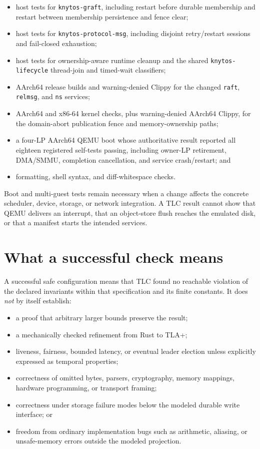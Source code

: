 \begin{itemize}
    \item host tests for \texttt{knytos-graft}, including restart before durable
        membership and restart between membership persistence and fence clear;
    \item host tests for \texttt{knytos-protocol-msg}, including disjoint
        retry/restart sessions and fail-closed exhaustion;
    \item host tests for ownership-aware runtime cleanup and the shared
        \texttt{knytos-lifecycle} thread-join and timed-wait classifiers;
    \item AArch64 release builds and warning-denied Clippy for the changed
        \texttt{raft}, \texttt{relmsg}, and \texttt{ns} services;
    \item AArch64 and x86-64 kernel checks, plus warning-denied AArch64 Clippy,
        for the domain-abort publication fence and memory-ownership paths;
    \item a four-LP AArch64 QEMU boot whose authoritative result reported all
        eighteen registered self-tests passing, including owner-LP retirement,
        DMA/SMMU, completion cancellation, and service crash/restart; and
    \item formatting, shell syntax, and diff-whitespace checks.
\end{itemize}

Boot and multi-guest tests remain necessary when a change affects the concrete
scheduler, device, storage, or network integration. A TLC result cannot show
that QEMU delivers an interrupt, that an object-store flush reaches the
emulated disk, or that a manifest starts the intended services.

\section{What a successful check means}

A successful safe configuration means that TLC found no reachable violation
of the declared invariants within that specification and its finite constants.
It does \emph{not} by itself establish:

\begin{itemize}
    \item a proof that arbitrary larger bounds preserve the result;
    \item a mechanically checked refinement from Rust to TLA+;
    \item liveness, fairness, bounded latency, or eventual leader election
        unless explicitly expressed as temporal properties;
    \item correctness of omitted bytes, parsers, cryptography, memory mappings,
        hardware programming, or transport framing;
    \item correctness under storage failure modes below the modeled durable
        write interface; or
    \item freedom from ordinary implementation bugs such as arithmetic,
        aliasing, or unsafe-memory errors outside the modeled projection.
\end{itemize}

